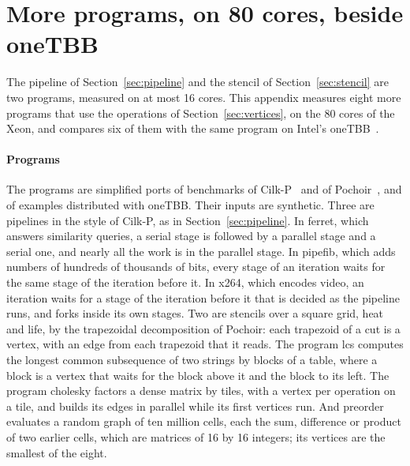 \documentclass[sigplan,nonacm]{acmart}
\begin{document}
\section{More programs, on 80 cores, beside oneTBB}
\label{sec:bench}

The pipeline of Section~\ref{sec:pipeline} and the stencil of
Section~\ref{sec:stencil} are two programs, measured on at most 16
cores.
%
This appendix measures eight more programs that use the operations of
Section~\ref{sec:vertices}, on the 80 cores of the Xeon, and compares
six of them with the same program on Intel's
oneTBB~\cite{onetbb,flexibench-dag-bench-icelake}.

\paragraph{Programs}
%
The programs are simplified ports of benchmarks of
Cilk-P~\cite{lee2013piper} and of Pochoir~\cite{tang2011pochoir}, and
of examples distributed with oneTBB.
%
Their inputs are synthetic.
%
Three are pipelines in the style of Cilk-P, as in
Section~\ref{sec:pipeline}.
%
In ferret, which answers similarity queries, a serial stage is
followed by a parallel stage and a serial one, and nearly all the work
is in the parallel stage.
%
In pipefib, which adds numbers of hundreds of thousands of bits, every
stage of an iteration waits for the same stage of the iteration before
it.
%
In x264, which encodes video, an iteration waits for a stage of the
iteration before it that is decided as the pipeline runs, and forks
inside its own stages.
%
Two are stencils over a square grid, heat and life, by the trapezoidal
decomposition of Pochoir: each trapezoid of a cut is a vertex, with an
edge from each trapezoid that it reads.
%
The program lcs computes the longest common subsequence of two strings
by blocks of a table, where a block is a vertex that waits for the
block above it and the block to its left.
%
The program cholesky factors a dense matrix by tiles, with a vertex
per operation on a tile, and builds its edges in parallel while its
first vertices run.
%
And preorder evaluates a random graph of ten million cells, each the
sum, difference or product of two earlier cells, which are matrices of
16 by 16 integers; its vertices are the smallest of the eight.
\end{document}
